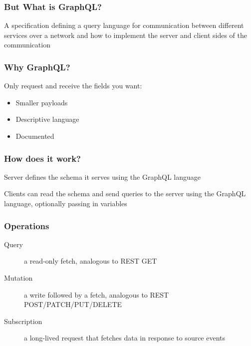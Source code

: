\documentclass[notes]{beamer}
\begin{document}
\begin{frame}
  \frametitle{But What is GraphQL?}
  A specification defining a query language for communication between different services over a network and how to implement the server and client sides of the communication
\end{frame}


\begin{frame}
  \frametitle{Why GraphQL?}
  Only request and receive the fields you want:
  \begin{itemize}
  \item Smaller payloads
  \item Descriptive language
  \item Documented
  \end{itemize}
\end{frame}


\begin{frame}
  \frametitle{How does it work?}
  Server defines the schema it serves using the GraphQL language

  Clients can read the schema and send queries to the server using the GraphQL language, optionally passing in variables
\end{frame}


\begin{frame}
  \frametitle{Operations}
  \begin{description}
    \item[Query] a read-only fetch, analogous to REST GET
    \item[Mutation] a write followed by a fetch, analogous to REST POST/PATCH/PUT/DELETE
    \item[Subscription] a long-lived request that fetches data in response to source events
  \end{description}
\end{frame}
\end{document}
